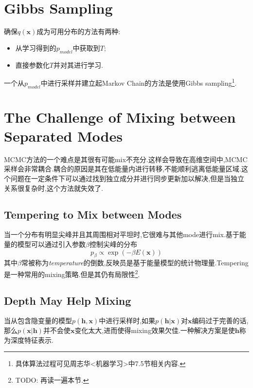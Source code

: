 \section{Gibbs Sampling}

确保$q(\bm x)$成为可用分布的方法有两种:
\begin{itemize}
    \item 从学习得到的$p_{model}$中获取到$T$;
    \item 直接参数化$T$并对其进行学习.
\end{itemize}

一个从$p_{model}$中进行采样并建立起Markov Chain的方法是使用Gibbs sampling\footnote{具体算法过程可见周志华<机器学习>中7.5节相关内容.}.

\section{The Challenge of Mixing between Separated Modes}

MCMC方法的一个难点是其很有可能mix不充分.这样会导致在高维空间中,MCMC采样会非常耦合.耦合的原因是其在低能量内进行转移,不能顺利逃离低能量区域.这个问题在一定条件下可以通过找到独立成分并进行同步更新加以解决,但是当独立关系很复杂时,这个方法就失效了.

\subsection{Tempering to Mix between Modes}

当一个分布有明显尖峰并且其周围相对平坦时,它很难与其他mode进行mix.基于能量的模型可以通过引入参数$\beta$控制尖峰的分布
\begin{equation}
p_\beta\propto\exp(-\beta E(\bm x))
\end{equation}
其中$\beta$常被称为\textit{temperature}的倒数,反映员是基于能量模型的统计物理量.Tempering是一种常用的mixing策略.但是其仍有局限性\footnote{TODO: 再读一遍本节.}.

\subsection{Depth May Help Mixing}

当从包含隐变量的模型$p(\bm{h,x})$中进行采样时,如果$p(\bm{h|x})$对$\bm x$编码过于完善的话,那么$p(\bm{x|h})$并不会使$\bm x$变化太大,进而使得mixing效果欠佳.一种解决方案是使$\bm h$称为深度特征表示.